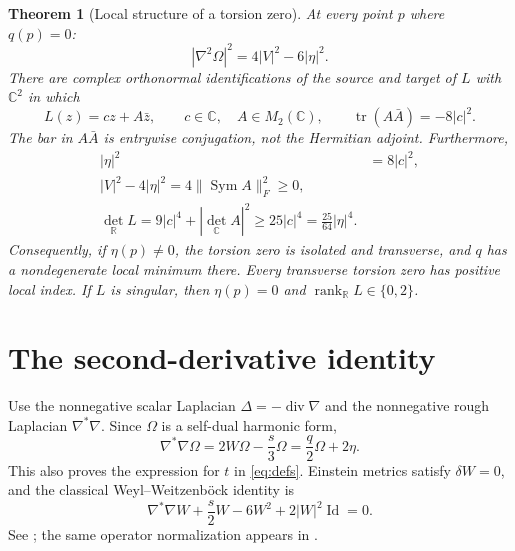\documentclass[11pt]{article}
\newtheorem{theorem}{Theorem}[section]
\theoremstyle{remark}\newtheorem{remark}[theorem]{Remark}
\newcommand{\tr}{\operatorname{tr}}
\newcommand{\diver}{\operatorname{div}}
\newcommand{\Sym}{\operatorname{Sym}}
\newcommand{\Id}{\operatorname{Id}}
\begin{document}
\begin{theorem}[Local structure of a torsion zero]\label{thm:main}
At every point $p$ where $q(p)=0$:
\begin{equation}
 \boxed{|\nabla^2\Omega|^2=4|V|^2-6|\eta|^2.}\label{eq:zero-balance}
\end{equation}
There are complex orthonormal identifications of the source and target
of $L$ with $\mathbb C^2$ in which
\begin{equation}
 L(z)=c z+A\bar z,\qquad c\in\mathbb C,\quad A\in M_2(\mathbb C),
 \qquad \tr(A\bar A)=-8|c|^2.\label{eq:normal}
\end{equation}
The bar in $A\bar A$ is entrywise conjugation, not the Hermitian adjoint.
Furthermore,
\begin{align}
 |\eta|^2&=8|c|^2,\label{eq:eta-c}\\
 \boxed{|V|^2-4|\eta|^2=4\|\Sym A\|_F^2\ge0,}\label{eq:Veta}\\
 \boxed{\det_{\mathbb R}L
 =9|c|^4+|\det_{\mathbb C}A|^2
 \ge25|c|^4=\frac{25}{64}|\eta|^4.}\label{eq:det}
\end{align}
Consequently, if $\eta(p)\ne0$, the torsion zero is isolated and
transverse, and $q$ has a nondegenerate local minimum there. Every
transverse torsion zero has positive local index. If $L$ is singular,
then $\eta(p)=0$ and $\operatorname{rank}_{\mathbb R}L\in\{0,2\}$.
\end{theorem}

\section{The second-derivative identity}
Use the nonnegative scalar Laplacian $\Delta=-\diver\nabla$ and the
nonnegative rough Laplacian $\nabla^*\nabla$. Since $\Omega$ is a
self-dual harmonic form,
\begin{equation}
 \nabla^*\nabla\Omega=2W\Omega-\frac{s}{3}\Omega
                    =\frac q2\Omega+2\eta.\label{eq:form-WB}
\end{equation}
This also proves the expression for $t$ in \eqref{eq:defs}. Einstein
metrics satisfy $\delta W=0$, and the classical Weyl--Weitzenb\"ock
identity is
\begin{equation}
 \nabla^*\nabla W+\frac{s}{2}W-6W^2+2|W|^2\Id=0.
 \label{eq:W-WB}
\end{equation}
See \cite{Derdzinski}; the same operator normalization appears in
\cite[Lemma 2.5, with $f=1$]{CD}.
\end{document}
